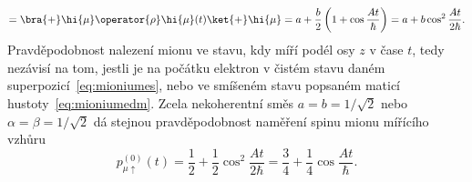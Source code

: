 \begin{solution}
\begin{enumerate}
\begin{equation}
				=\bra{+}\hi{\mu}\operator{\rho}\hi{\mu}(t)\ket{+}\hi{\mu}
				=a+\frac{b}{2}\left(1+\cos{\frac{At}{\hbar}}\right)
				=a+b\cos^{2}\frac{At}{2\hbar}.
		\end{equation}
		Pravděpodobnost nalezení mionu ve stavu, kdy míří podél osy $z$ v čase $t$, tedy nezávisí na tom, jestli je na počátku elektron v čistém stavu daném superpozicí~\eqref{eq:mioniumes}, nebo ve smíšeném stavu popsaném maticí hustoty~\eqref{eq:mioniumedm}.
		Zcela nekoherentní směs $a=b=1/\sqrt{2}$ nebo $\alpha=\beta=1/\sqrt{2}$ dá stejnou pravděpodobnost naměření spinu mionu mířícího vzhůru
		\begin{equation}
			p_{\mu\uparrow}^{(0)}(t)
				=\frac{1}{2}+\frac{1}{2}\cos^{2}\frac{At}{2\hbar}
				=\frac{3}{4}+\frac{1}{4}\cos{\frac{At}{\hbar}}.
		\end{equation}	
	\end{enumerate}
\end{solution}
